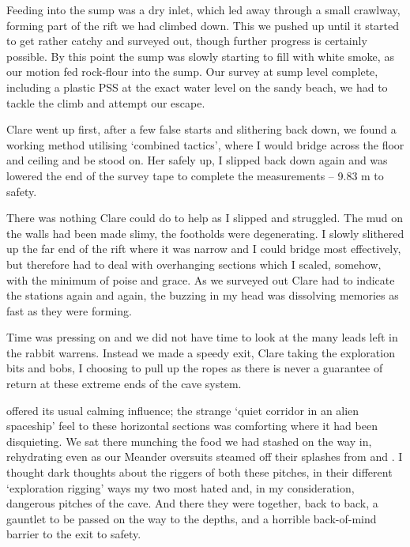 Feeding into the sump was a dry inlet,
which led away through a small crawlway, forming part of the rift we had climbed down. 
This we pushed up until it started
to get rather catchy and surveyed out, though further progress is
certainly possible. 
By this point the sump was slowly starting to fill with white smoke, as our motion fed rock-flour into the sump. 
Our survey at sump level complete, including a plastic
PSS at the exact water level on the sandy beach, we had to tackle the climb and attempt our escape. 

Clare
went up first, after a few false starts and slithering back down, we
found a working method utilising `combined tactics', where I would
bridge across the floor and ceiling and be stood on. Her safely up, I
slipped back down again and was lowered the end of the survey tape to
complete the measurements -- 9.83 m to safety.

There was nothing Clare could do to help as I slipped and struggled. The
mud on the walls had been made slimy, the footholds were degenerating. I
slowly slithered up the far end of the rift where it was narrow and I
could bridge most effectively, but therefore had to deal with
overhanging sections which I scaled, somehow, with the minimum of poise
and grace. As we surveyed out Clare had to indicate the stations again
and again, the buzzing in my head was dissolving memories as fast as
they were forming.

Time was pressing on and we did not have time to look at the many leads
left in the rabbit warrens. Instead we made a speedy exit, Clare taking
the exploration bits and bobs, I choosing to pull up the ropes as there
is never a guarantee of return at these extreme ends of the cave system.


 offered its usual calming influence; the strange `quiet
corridor in an alien spaceship' feel to these horizontal sections was
comforting where it had been disquieting. We sat there munching the food
we had stashed on the way in, rehydrating even as our Meander oversuits
steamed off their splashes from  and . I thought
dark thoughts about the riggers of both these pitches, in their
different `exploration rigging' ways my two most hated and, in my
consideration, dangerous pitches of the cave. And there they were
together, back to back, a gauntlet to be passed on the way to the
depths, and a horrible back-of-mind barrier to the exit to safety.

